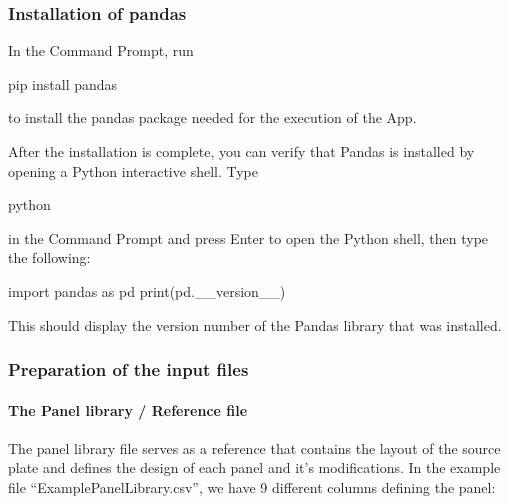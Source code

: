 \documentclass[
]{article}
\newenvironment{Shaded}{\begin{snugshade}}{\end{snugshade}}
\newcommand{\NormalTok}[1]{#1}
\begin{document}
\hypertarget{installation-of-pandas}{%
\subsubsection{Installation of pandas}\label{installation-of-pandas}}

In the Command Prompt, run

\begin{Shaded}
\begin{Highlighting}[]
\NormalTok{pip install pandas}
\end{Highlighting}
\end{Shaded}

to install the pandas package needed for the execution of the App.

After the installation is complete, you can verify that Pandas is
installed by opening a Python interactive shell. Type

\begin{Shaded}
\begin{Highlighting}[]
\NormalTok{python}
\end{Highlighting}
\end{Shaded}

in the Command Prompt and press Enter to open the Python shell, then
type the following:

\begin{Shaded}
\begin{Highlighting}[]
\NormalTok{import pandas as pd}
\NormalTok{print(pd.\_\_version\_\_)}
\end{Highlighting}
\end{Shaded}

This should display the version number of the Pandas library that was
installed.

\hypertarget{preparation-of-the-input-files}{%
\subsubsection{Preparation of the input
files}\label{preparation-of-the-input-files}}

\hypertarget{the-panel-library-reference-file}{%
\paragraph{The Panel library / Reference
file}\label{the-panel-library-reference-file}}

The panel library file serves as a reference that contains the layout of
the source plate and defines the design of each panel and it's
modifications. In the example file ``ExamplePanelLibrary.csv'', we have
9 different columns defining the panel:
\end{document}

